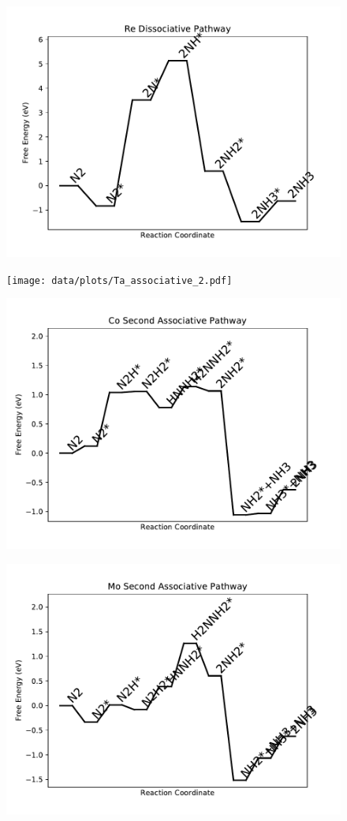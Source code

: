 \begin{figure}
\includegraphics[width=0.8\linewidth]{data/plots/Re_dissociative.pdf}
\label{fig:Re_dissociative}
\end{figure}

\begin{figure}
\texttt{[image: data/plots/Ta\_associative\_2.pdf]}
\label{fig:Ta_associative_2}
\end{figure}

\begin{figure}
\includegraphics[width=0.8\linewidth]{data/plots/Co_associative_2.pdf}
\label{fig:Co_associative_2}
\end{figure}

\begin{figure}
\includegraphics[width=0.8\linewidth]{data/plots/Mo_associative_2.pdf}
\label{fig:Mo_associative_2}
\end{figure}

